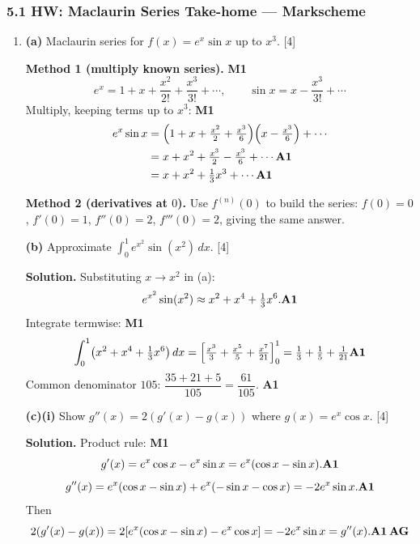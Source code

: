 \documentclass[12pt, twoside]{article}
\begin{document}
\subsubsection*{5.1 HW: Maclaurin Series Take-home --- Markscheme}

\begin{enumerate}[itemsep=0.3cm]

\item[4.] 

\textbf{(a)} Maclaurin series for $f(x) = e^x \sin x$ up to $x^3$.
\hfill [4]

\textbf{Method 1 (multiply known series).} \hfill \textbf{M1}
\[
e^x = 1 + x + \frac{x^2}{2!} + \frac{x^3}{3!} + \cdots,\qquad
\sin x = x - \frac{x^3}{3!} + \cdots
\]
Multiply, keeping terms up to $x^3$: \hfill \textbf{M1}
\begin{align*}
e^x \sin x
&= \left(1 + x + \tfrac{x^2}{2} + \tfrac{x^3}{6}\right)\!\left(x - \tfrac{x^3}{6}\right) + \cdots \\
&= x + x^2 + \tfrac{x^3}{2} - \tfrac{x^3}{6} + \cdots \hfill \textbf{A1} \\
&= x + x^2 + \tfrac{1}{3}x^3 + \cdots \hfill \textbf{A1}
\end{align*}

\textbf{Method 2 (derivatives at $0$).} Use
$f^{(n)}(0)$ to build the series:
$f(0) = 0$, $f'(0) = 1$, $f''(0) = 2$, $f'''(0) = 2$, giving the same answer.

\medskip

\textbf{(b)} Approximate
$\displaystyle\int_0^1 e^{x^2} \sin(x^2)\, dx$. \hfill [4]

\textbf{Solution.} Substituting $x \to x^2$ in (a):
\[
e^{x^2} \sin(x^2) \approx x^2 + x^4 + \tfrac{1}{3}x^6. \hfill \textbf{A1}
\]
Integrate termwise: \hfill \textbf{M1}
\[
\int_0^1 \!\left(x^2 + x^4 + \tfrac{1}{3}x^6\right) dx
= \left[\tfrac{x^3}{3} + \tfrac{x^5}{5} + \tfrac{x^7}{21}\right]_0^1
= \tfrac{1}{3} + \tfrac{1}{5} + \tfrac{1}{21} \hfill \textbf{A1}
\]
Common denominator $105$: $\dfrac{35 + 21 + 5}{105} = \dfrac{61}{105}$.
\hfill \textbf{A1}

\medskip

\textbf{(c)(i)} Show $g''(x) = 2(g'(x) - g(x))$ where $g(x) = e^x \cos x$.
\hfill [4]

\textbf{Solution.} Product rule: \hfill \textbf{M1}
\[
g'(x) = e^x \cos x - e^x \sin x = e^x(\cos x - \sin x). \hfill \textbf{A1}
\]
\[
g''(x) = e^x(\cos x - \sin x) + e^x(-\sin x - \cos x) = -2 e^x \sin x.
\hfill \textbf{A1}
\]
Then
\[
2(g'(x) - g(x)) = 2\!\left[e^x(\cos x - \sin x) - e^x \cos x\right]
= -2 e^x \sin x = g''(x). \hfill \textbf{A1\,AG}
\]


\end{enumerate}
\end{document}
